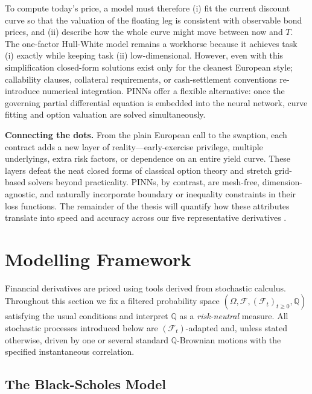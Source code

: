 \documentclass[12pt]{report} %
\theoremstyle{plain}           %
\theoremstyle{definition}      %
\theoremstyle{remark}          %
\begin{document}
To compute today's price, a model must therefore (i) fit the current discount curve so that the
valuation of the floating leg is consistent with observable bond prices, and (ii) describe how
the whole curve might move between now and \(T\).  The one-factor Hull-White model remains a
workhorse because it achieves task (i) exactly while keeping task (ii) low-dimensional.
However, even with this simplification closed-form solutions exist only for the cleanest
European style; callability clauses, collateral requirements, or cash-settlement conventions
re-introduce numerical integration.  PINNs offer a flexible alternative: once the governing
partial differential equation is embedded into the neural network, curve fitting and option
valuation are solved simultaneously.

\medskip
\noindent\textbf{Connecting the dots.}
From the plain European call to the swaption, each contract adds a new layer of
reality—early-exercise privilege, multiple underlyings, extra risk factors, or dependence on an
entire yield curve.  These layers defeat the neat closed forms of classical option theory and
stretch grid-based solvers beyond practicality.  PINNs, by contrast, are mesh-free,
dimension-agnostic, and naturally incorporate boundary or inequality constraints in their loss
functions.  The remainder of the thesis will quantify how these attributes translate into
speed and accuracy across our five representative derivatives
\cite{huge2020differentialmachinelearning,heaton2018deeplearningfinance}.

\section{Modelling Framework}\label{sec:modelling_framework}

Financial derivatives are priced using tools derived from stochastic calculus.
Throughout this section we fix a filtered probability space
$(\Omega,\mathcal{F},(\mathcal{F}_t)_{t\ge0},\mathbb{Q})$ satisfying
the usual conditions and interpret $\mathbb{Q}$ as a
\emph{risk-neutral} measure.  All stochastic processes introduced
below are $(\mathcal{F}_t)$-adapted and, unless stated otherwise,
driven by one or several standard $\mathbb{Q}$-Brownian motions with
the specified instantaneous correlation.

\subsection{The Black-Scholes Model}\label{sec:bs_dynamics}
\end{document}

